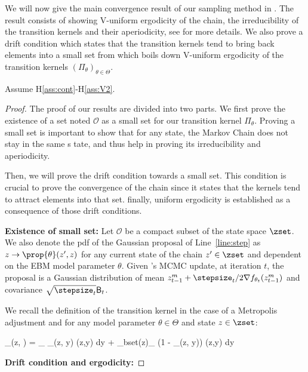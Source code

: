\documentclass{article}
\begin{document}
We will now give the main convergence result of our sampling method in \algo.
The result consists of showing V-uniform ergodicity of the chain, the irreducibility of the transition kernels and their aperiodicity, see \cite{meyn2012markov} for more details. 
We also prove a drift condition which states that the transition kernels tend to bring back elements into a small set from which boils down V-uniform ergodicity of the transition kernels $(\Pi_\theta)_{\theta \in \Theta}$.


\begin{Theorem}
Assume H\ref{ass:cont}-H\ref{ass:V2}.

\end{Theorem}


\begin{proof}
The proof of our results are divided into two parts.
We first prove the existence of a set noted $\mathcal{O}$ as a small set for our transition kernel $\Pi_\theta$.
Proving a small set is important to show that for any state, the Markov Chain does not stay in the same s
tate, and thus help in proving its irreducibility and aperiodicity.

Then, we will prove the drift condition towards a small set.
This condition is crucial to prove the convergence of the chain since it states that the kernels tend to attract elements into that set. 
finally, uniform ergodicity is established as a consequence of those drift conditions.

\medskip
\textbf{Existence of small set: }
Let $\mathcal{O}$ be a compact subset of the state space $\zset$.
We also denote the pdf of the Gaussian proposal of Line~\ref{line:step} as $z \to \prop{\theta}(z',z)$ for any current state of the chain $z' \in \zset$ and dependent on the EBM model parameter $\theta$.
Given \algo's MCMC update, at iteration $t$, the proposal is a Gaussian distribution of mean $z_{t-1}^m+ \stepsize_t/2  \nabla f_{\theta_t}(z_{t-1}^m)$ and covariance $\sqrt{\stepsize_t} \mathsf{B}_t$.

We recall the definition of the transition kernel in the case of a Metropolis adjustment and for any model parameter $\theta \in \Theta$ and state $z \in \zset$:

\beq
\Pi_\theta(z, \bset) = \int_{\bset} \alpha_\theta(z, y) \prop{\theta}(z,y) \textrm{d}y + _bset(z)\int_{\zset} (1 - \alpha_\theta(z, y)) \prop{\theta}(z,y) \textrm{d}y
\eeq





\medskip
\textbf{Drift condition and ergodicity: }

\end{proof}
\end{document}
